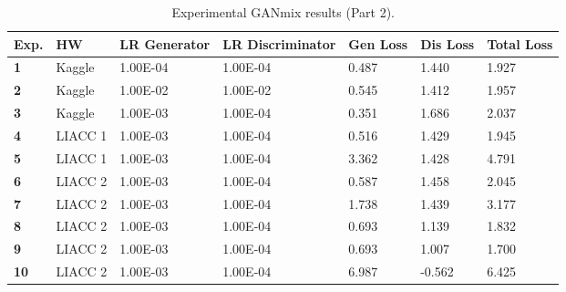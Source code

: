 \begin{table}[ht]
\caption{Experimental GANmix results (Part 2).}
\label{tab:ganmix-results-2}
\begin{tabularx}{\textwidth}{|l|X|X|X|X|X|X|}
\hline
\textbf{Exp.} & \textbf{HW} & \textbf{LR Generator} & \textbf{LR Discriminator} & \textbf{Gen Loss} & \textbf{Dis Loss} & \textbf{Total Loss} \\ \hline
\textbf{1}    & Kaggle      & 1.00E-04              & 1.00E-04                  & 0.487             & 1.440             & 1.927               \\ \hline
\textbf{2}    & Kaggle      & 1.00E-02              & 1.00E-02                  & 0.545             & 1.412             & 1.957               \\ \hline
\textbf{3}    & Kaggle      & 1.00E-03              & 1.00E-04                  & 0.351             & 1.686             & 2.037               \\ \hline
\textbf{4}    & LIACC 1     & 1.00E-03              & 1.00E-04                  & 0.516             & 1.429             & 1.945               \\ \hline
\textbf{5}    & LIACC 1     & 1.00E-03              & 1.00E-04                  & 3.362             & 1.428             & 4.791               \\ \hline
\textbf{6}    & LIACC 2     & 1.00E-03              & 1.00E-04                  & 0.587             & 1.458             & 2.045               \\ \hline
\textbf{7}    & LIACC 2     & 1.00E-03              & 1.00E-04                  & 1.738             & 1.439             & 3.177               \\ \hline
\textbf{8}    & LIACC 2     & 1.00E-03              & 1.00E-04                  & 0.693             & 1.139             & 1.832               \\ \hline
\textbf{9}    & LIACC 2     & 1.00E-03              & 1.00E-04                  & 0.693             & 1.007             & 1.700               \\ \hline
\textbf{10}   & LIACC 2     & 1.00E-03              & 1.00E-04                  & 6.987                  & -0.562                  & 6.425               \\ \hline
\end{tabularx}
\end{table}